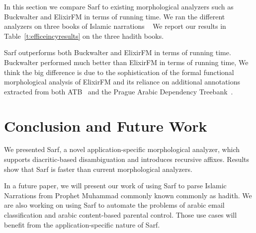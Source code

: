 \documentclass[11pt]{article}
\begin{document}
\begin{table}[tb]
\centering
\caption{Comparsion of Running Time}
\normalsize
\label{t:efficeincyresults}
\end{table}

In this section we compare Sarf to existing 
morphological analyzers such as Buckwalter and ElixirFM in terms of running time.
We ran the different analyzers on
three books of Islamic narrations  ~\cite{IbnHanbal,AlTousi,AlKulayni}
We report our results in Table~\ref{t:efficeincyresults} on the 
three hadith books.

Sarf outperforms both Buckwalter and ElixirFM in terms of 
running time. 
Buckwalter performed much better than ElixirFM in 
terms of running time, 
We think the big difference is due to the sophistication of 
the formal functional morphological analysis of ElixirFM 
and its reliance on additional annotations extracted from 
both ATB~\cite{Maamouri:04} and the Prague Arabic Dependency Treebank~\cite{Prague04}.

\section{Conclusion and Future Work}
\label{sec:future}

We presented Sarf, a novel application-specific morphological analyzer,
which supports diacritic-based disambiguation and introduces recursive affixes.
Results show that Sarf is faster than
current morphological analyzers.

In a future paper, we will present our work of using Sarf to 
parse Islamic Narrations from Prophet Muhammad commonly known commonly as hadith.
We are also working on using Sarf to automate the problems of
arabic email classification and
arabic content-based parental control.
Those use cases will benefit from the application-specific nature of Sarf.
\end{document}
